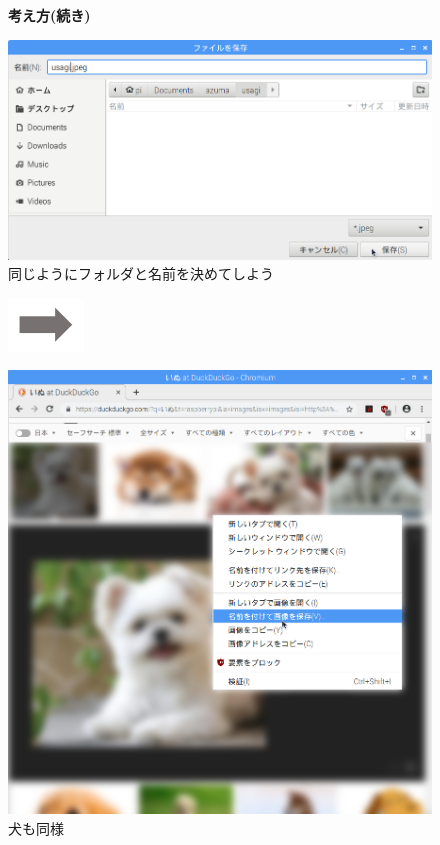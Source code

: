 \clearpage

\begin{figure}[t]
  \textbf{考え方(続き)}

  \begin{minipage}{0.4\textwidth}
    \includegraphics[width=\linewidth]{text01-img/textbook-img103.png}
     同じようにフォルダと名前を決めてしよう
  \end{minipage}
  \includegraphics[width=2cm]{text01-img/textbook-img073.png}
  \begin{minipage}{0.4\textwidth}
    \includegraphics[width=\linewidth]{text01-img/textbook-img092.png}
     犬も同様
  \end{minipage}


\end{figure}
